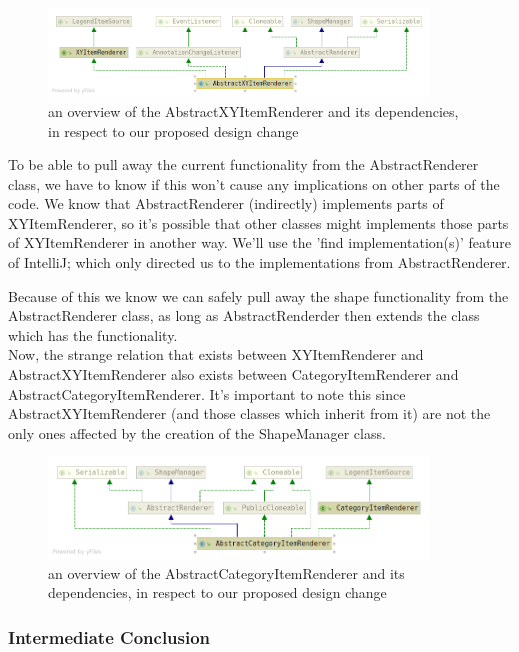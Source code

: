 \documentclass{article}
\begin{document}
\begin{figure}[H]
\centering
	\includegraphics[width=0.9\textwidth]{RefactorStage1aDesign.png}
	\caption{an overview of the AbstractXYItemRenderer and its dependencies, in respect to our proposed design change}
\end{figure}

To be able to pull away the current functionality from the AbstractRenderer class, we have to know if this won't cause any implications on other parts of the code. We know that AbstractRenderer (indirectly) implements parts of XYItemRenderer, so it's possible that other classes might implements those parts of XYItemRenderer in another way. We'll use the 'find implementation(s)' feature of IntelliJ; which only directed us to the implementations from AbstractRenderer.

Because of this we know we can safely pull away the shape functionality from the AbstractRenderer class, as long as AbstractRenderder then extends the class which has the functionality. \\

\noindent
Now, the strange relation that exists between XYItemRenderer and AbstractXYItemRenderer also exists between CategoryItemRenderer and AbstractCategoryItemRenderer. It's important to note this since AbstractXYItemRenderer (and those classes which inherit from it) are not the only ones affected by the creation of the ShapeManager class.

\begin{figure}[H]
\centering
	\includegraphics[width=0.9\textwidth]{RefactorStage1bDesign.png}
	\caption{an overview of the AbstractCategoryItemRenderer and its dependencies, in respect to our proposed design change}
\end{figure}

\subsubsection{Intermediate Conclusion}
\end{document}
